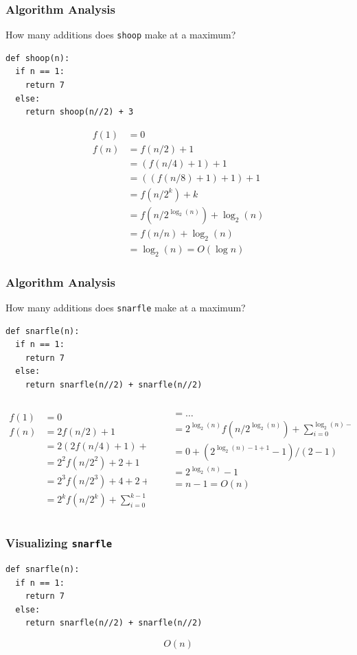 \documentclass{beamer}
\newcommand{\bfr}[1]{\begin{frame}[fragile]\frametitle{{ #1 }}}
\newcommand{\cola}{\begin{columns}\begin{column}{0.5\textwidth}}
\newcommand{\colb}{\end{column}\begin{column}{0.5\textwidth}}
\newcommand{\colc}{\end{column}\end{columns}}
\begin{document}
\bfr{Algorithm Analysis}
How many additions does {\tt shoop} make at a maximum?
\begin{lstlisting}
def shoop(n):
  if n == 1:
    return 7
  else:
    return shoop(n//2) + 3
\end{lstlisting}
\begin{align*}
f(1) &= 0\\
f(n) &= f(n/2) + 1\\
     &= (f(n/4) + 1) + 1\\
     &= ((f(n/8) + 1) + 1) + 1\\
     &= f(n/2^k) + k\\
     &= f(n/2^{\log_2(n)}) + \log_2(n)\\
     &= f(n/n) + \log_2(n)\\
     &= \log_2(n) = O(\log n)
\end{align*}
\end{frame}

\bfr{Algorithm Analysis}
How many additions does {\tt snarfle} make at a maximum?
\begin{lstlisting}
def snarfle(n):
  if n == 1:
    return 7
  else:
    return snarfle(n//2) + snarfle(n//2)
\end{lstlisting}
\cola
\begin{align*}
f(1) &= 0\\
f(n) &= 2f(n/2) + 1\\
     &= 2(2f(n/4) + 1) + 1\\
     &= 2^2f(n/2^2) + 2 + 1 \\
     &= 2^3f(n/2^3) + 4 + 2 + 1\\
     &= 2^kf(n/2^k) + \sum_{i=0}^{k-1}2^i 
\end{align*}
\colb\pause
\begin{align*}
     &= \ldots\\
     &= 2^{\log_2(n)}f(n/2^{\log_2(n)}) + \sum_{i=0}^{\log_2(n)-1} 2^i\\
     &= 0 + (2^{\log_2(n)-1+1}-1)/(2-1)\\
     &= 2^{\log_2(n)} - 1\\
     &= n-1 = O(n)
\end{align*}
\colc

\end{frame}


\bfr{Visualizing {\tt snarfle}}

\begin{lstlisting}
def snarfle(n):
  if n == 1:
    return 7
  else:
    return snarfle(n//2) + snarfle(n//2)
\end{lstlisting}
\[O(n)\]
\end{frame}
\end{document}
